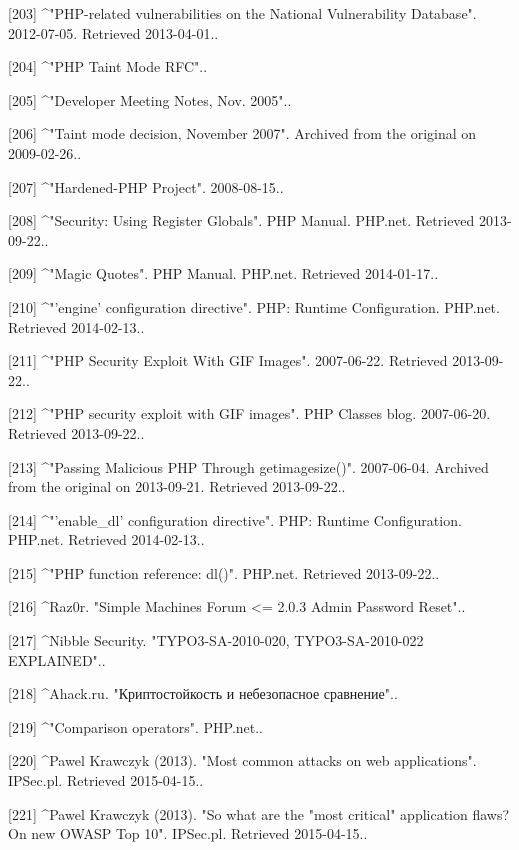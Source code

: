 [203]
^"PHP-related vulnerabilities on the National Vulnerability Database". 2012-07-05. Retrieved 2013-04-01..

[204]
^"PHP Taint Mode RFC"..

[205]
^"Developer Meeting Notes, Nov. 2005"..

[206]
^"Taint mode decision, November 2007". Archived from the original on 2009-02-26..

[207]
^"Hardened-PHP Project". 2008-08-15..

[208]
^"Security: Using Register Globals". PHP Manual. PHP.net. Retrieved 2013-09-22..

[209]
^"Magic Quotes". PHP Manual. PHP.net. Retrieved 2014-01-17..

[210]
^"'engine' configuration directive". PHP: Runtime Configuration. PHP.net. Retrieved 2014-02-13..

[211]
^"PHP Security Exploit With GIF Images". 2007-06-22. Retrieved 2013-09-22..

[212]
^"PHP security exploit with GIF images". PHP Classes blog. 2007-06-20. 
Retrieved 2013-09-22..

[213]
^"Passing Malicious PHP Through getimagesize()". 2007-06-04. Archived from the original on 2013-09-21. Retrieved 2013-09-22..

[214]
^"'enable_dl' configuration directive". PHP: Runtime Configuration. PHP.net. Retrieved 2014-02-13..

[215]
^"PHP function reference: dl()". PHP.net. Retrieved 2013-09-22..

[216]
^Raz0r. "Simple Machines Forum <= 2.0.3 Admin Password Reset"..

[217]
^Nibble Security. "TYPO3-SA-2010-020, TYPO3-SA-2010-022 EXPLAINED"..

[218]
^Ahack.ru. "Криптостойкость и небезопасное сравнение"..

[219]
^"Comparison operators". PHP.net..

[220]
^Pawel Krawczyk (2013). "Most common attacks on web applications". IPSec.pl. Retrieved 2015-04-15..

[221]
^Pawel Krawczyk (2013). "So what are the "most critical" application flaws? On new OWASP Top 10". IPSec.pl. Retrieved 2015-04-15..